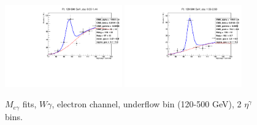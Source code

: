 \begin{figure}[htb]
  \begin{center}
   \includegraphics[width=0.45\textwidth]{../figs/figs_v11/ELECTRON_WGamma/EtoGammaFits/sa_hZmass_h_Data_EtoGamma_Enr_BARREL_pt120to500_ieta0_noWMtCut.pdf}
   \includegraphics[width=0.45\textwidth]{../figs/figs_v11/ELECTRON_WGamma/EtoGammaFits/sa_hZmass_h_Data_EtoGamma_Enr_ENDCAP_pt120to500_ieta0_noWMtCut.pdf}\\
  \label{fig:etogFits_120to500}
  \caption{$M_{e\gamma}$ fits, $W\gamma$, electron channel, underflow bin (120-500 GeV), 2 $\eta^{\gamma}$ bins.}
  \end{center}
\end{figure}


